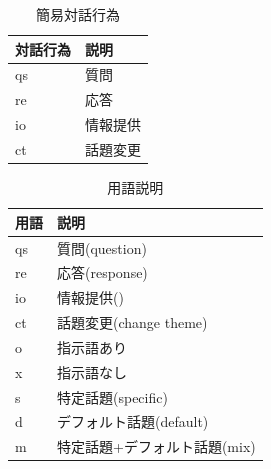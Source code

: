 \documentclass[12pt,a4paper,twoside,openany]{jbook}
\begin{document}
\begin{table}[tb]
    \caption{簡易対話行為}\label{kani}
    \centering
    \begin{tabular}{|l|l|}\hline 
         対話行為&説明  \\ \hline \hline
         qs&質問 \\ \hline
         re&応答 \\ \hline
         io&情報提供 \\ \hline
         ct&話題変更 \\ \hline

    \end{tabular}
\end{table}
\begin{table}[tb]
    \caption{用語説明}\label{yougo}
    \centering
    \begin{tabular}{|l|l|}\hline 
         用語&説明  \\ \hline \hline
         qs&質問(question) \\ \hline
         re&応答(response) \\ \hline
         io&情報提供() \\ \hline
         ct&話題変更(change theme) \\ \hline \hline
        o&指示語あり \\ \hline
        x&指示語なし \\ \hline \hline
        s&特定話題(specific) \\ \hline
        d&デフォルト話題(default) \\ \hline
        m&特定話題+デフォルト話題(mix) \\ \hline
        
    \end{tabular}
\end{table}

\end{document}

